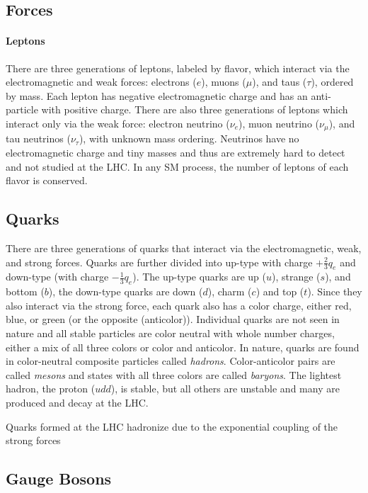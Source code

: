 \subsection{Forces}



\paragraph{Leptons}
There are three generations of leptons, labeled by flavor, which interact via the electromagnetic and weak forces: electrons ($e$), muons ($\mu$), and taus ($\tau$), ordered by mass. Each lepton has negative electromagnetic charge and has an anti-particle with positive charge. There are also three generations of leptons which interact only via the weak force: electron neutrino ($\nu_{e}$), muon neutrino ($\nu_{\mu}$), and tau neutrinos ($\nu_{\tau}$), with unknown mass ordering. Neutrinos have no electromagnetic charge and tiny masses and thus are extremely hard to detect and not studied at the \ac{LHC}. In any \ac{SM} process, the number of leptons of each flavor is conserved. 

\subsection{Quarks}
There are three generations of quarks that interact via the electromagnetic, weak, and strong forces. Quarks are further divided into up-type with charge $+\frac{2}{3}q_{e}$ and down-type (with charge $-\frac{1}{3}q_{e}$). The up-type quarks are up ($u$), strange ($s$), and bottom ($b$), the down-type quarks are down ($d$), charm ($c$) and top ($t$). Since they also interact via the strong force, each quark also has a color charge, either red, blue, or green (or the opposite (anticolor)). Individual quarks are not seen in nature and all stable particles are color neutral with whole number charges, either a mix of all three colors or color and anticolor. In nature, quarks are found in color-neutral composite particles called \emph{hadrons}. Color-anticolor pairs are called \emph{mesons} and states with all three colors are called \emph{baryons}. The lightest hadron, the proton ($udd$), is stable, but all others are unstable and many are produced and decay at the \ac{LHC}.

Quarks formed at the \ac{LHC} hadronize due to the exponential coupling of the strong forces


\subsection{Gauge Bosons}


